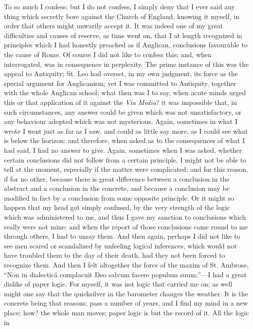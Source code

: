 To so much I confess; but I do not confess, I simply deny that I ever
said any thing which secretly bore against the Church of England,
knowing it myself, in order that others might unwarily accept it. It was
indeed one of my great difficulties and causes of reserve, as time went
on, that I at length recognized in principles which I had honestly
preached as if Anglican, conclusions favourable to the cause of Rome. Of course I did not like to confess this; and, when
interrogated, was in consequence in perplexity. The prime instance of
this was the appeal to Antiquity; St. Leo had overset, in my own
judgment, its force as the special argument for Anglicanism;
yet I was committed to Antiquity, together with the whole Anglican
school; what then was I to say, when acute minds urged this or
that application of it against the \emph{Via Media}? it was impossible
that, in such circumstances, any answer could be given which was not
unsatisfactory, or any behaviour adopted which was not mysterious.
Again, sometimes in what I wrote I went just as far as I saw, and could
as little say more, as I could see what is below the horizon; and
therefore, when asked as to the consequences of what I had said, I had no answer to give. Again, sometimes when I was asked,
whether certain conclusions did not follow from a certain principle, I
might not be able to tell at the moment, especially if the matter were
complicated; and for this reason, if for no other, because there is
great difference between a conclusion in the abstract and a conclusion
in the concrete, and because a conclusion may be modified in fact by a
conclusion from some opposite principle. Or it might so happen that my
head got simply confused, by the very strength of the
logic which was administered to me, and thus I gave my sanction
to conclusions which really were not mine; and when the report of those
conclusions came round to me through others, I had to unsay them. And
then again, perhaps I did not like to see men scared or scandalized by
unfeeling logical inferences, which would not have troubled
them to the day of their death, had they not been forced to recognize
them. And then I felt altogether the force of the maxim of St. Ambrose,
``Non in dialecticâ complacuit Deo salvum facere populum suum;''—I
had a great dislike of paper logic. For myself, it was not logic that
carried me on; as well might one say that the quicksilver in the
barometer changes the weather. It is the concrete being that reasons;
pass a number of years, and I find my mind in a new place; how? the
whole man moves; paper logic is but the record of it. All the logic in
